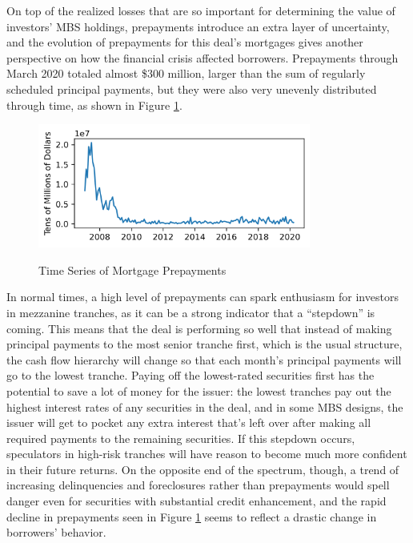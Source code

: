 \documentclass[12pt]{article}
\begin{document}
On top of the realized losses that are so important for determining the value of investors’ MBS holdings, prepayments introduce an extra layer of uncertainty, and the evolution of prepayments for this deal’s mortgages gives another perspective on how the financial crisis affected borrowers. Prepayments through March 2020 totaled almost \$300 million, larger than the sum of regularly scheduled principal payments, but they were also very unevenly distributed through time, as shown in Figure \ref{fig:timeseries_prepayments}.

\begin{figure}[h]
	\centering
	\caption{Time Series of Mortgage Prepayments}
	\includegraphics[width=0.8\textwidth]{../figures/timeseries_prepayments}
	\label{fig:timeseries_prepayments}
\end{figure}

In normal times, a high level of prepayments can spark enthusiasm for investors in mezzanine tranches, as it can be a strong indicator that a “stepdown” is coming. This means that the deal is performing so well that instead of making principal payments to the most senior tranche first, which is the usual structure, the cash flow hierarchy will change so that each month's principal payments will go to the lowest tranche. Paying off the lowest-rated securities first has the potential to save a lot of money for the issuer: the lowest tranches pay out the highest interest rates of any securities in the deal, and in some MBS designs, the issuer will get to pocket any extra interest that’s left over after making all required payments to the remaining securities. If this stepdown occurs, speculators in high-risk tranches will have reason to become much more confident in their future returns. On the opposite end of the spectrum, though, a trend of increasing delinquencies and foreclosures rather than prepayments would spell danger even for securities with substantial credit enhancement, and the rapid decline in prepayments seen in Figure \ref{fig:timeseries_prepayments} seems to reflect a drastic change in borrowers’ behavior.
\end{document}
